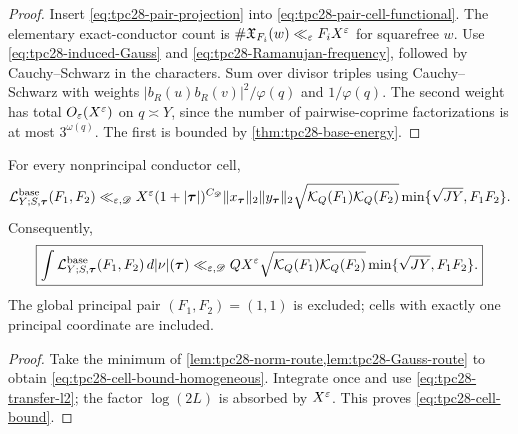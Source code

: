 \begin{proof}
Insert \eqref{eq:tpc28-pair-projection} into
\eqref{eq:tpc28-pair-cell-functional}.  The elementary exact-conductor
count is
\(\#\mathfrak X_{F_i}(w)\ll_\varepsilon F_iX^\varepsilon\) for squarefree $w$.
Use \eqref{eq:tpc28-induced-Gauss} and
\eqref{eq:tpc28-Ramanujan-frequency}, followed by Cauchy--Schwarz in
the characters.  Sum over divisor triples using Cauchy--Schwarz with
weights $|b_R(u)b_R(v)|^2/\varphi(q)$ and $1/\varphi(q)$.  The
second weight has total $O_\varepsilon(X^\varepsilon)$ on $q\asymp Y$, since the
number of pairwise-coprime factorizations is at most
$3^{\omega(q)}$.  The first is bounded by
\cref{thm:tpc28-base-energy}.
\end{proof}

\begin{theorem}
\label{thm:tpc28-cell-bound}
For every nonprincipal conductor cell,
\begin{equation}
 \mathcal L^{\rm base}_{Y;S,\boldsymbol\tau}(F_1,F_2)
 \ll_{\varepsilon,\mathscr D}X^\varepsilon
 (1+|\boldsymbol\tau|)^{C_{\mathscr D}}
 \|x_{\boldsymbol\tau}\|_2\|y_{\boldsymbol\tau}\|_2
 \sqrt{\mathcal K_Q(F_1)\mathcal K_Q(F_2)}
 \min\{\sqrt{JY},F_1F_2\}.
 \label{eq:tpc28-cell-bound-homogeneous}
\end{equation}
Consequently,
\begin{equation}
 \boxed{
 \int\mathcal L^{\rm base}_{Y;S,\boldsymbol\tau}(F_1,F_2)
 \,d|\nu|(\boldsymbol\tau)
 \ll_{\varepsilon,\mathscr D}QX^\varepsilon
 \sqrt{\mathcal K_Q(F_1)\mathcal K_Q(F_2)}
 \min\{\sqrt{JY},F_1F_2\}.}
 \label{eq:tpc28-cell-bound}
\end{equation}
The global principal pair $(F_1,F_2)=(1,1)$ is excluded; cells with
exactly one principal coordinate are included.
\end{theorem}

\begin{proof}
Take the minimum of \cref{lem:tpc28-norm-route,lem:tpc28-Gauss-route}
to obtain \eqref{eq:tpc28-cell-bound-homogeneous}.  Integrate once and
use \eqref{eq:tpc28-transfer-l2}; the factor $\log(2L)$ is absorbed by
$X^\varepsilon$.  This proves \eqref{eq:tpc28-cell-bound}.
\end{proof}
